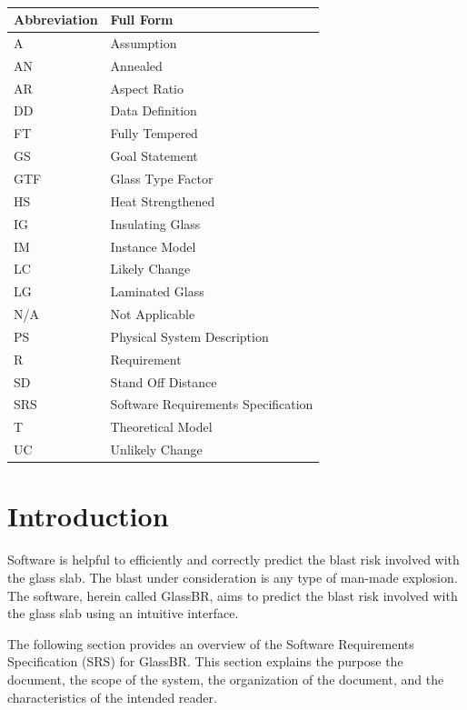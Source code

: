 \documentclass[12pt]{article}
\newcommand{\progname}{GlassBR}
\begin{document}
~\newline \renewcommand{\arraystretch}{1.2}
\noindent 
\begin{tabular}{l l } \toprule
  \textbf{Abbreviation} & \textbf{Full Form}\\
  \midrule
  A & Assumption\\
  AN & Annealed\\
  AR & Aspect Ratio\\
  DD & Data Definition\\
  FT & Fully Tempered\\
  GS & Goal Statement\\
  GTF & Glass Type Factor\\
  HS & Heat Strengthened \\
  IG & Insulating Glass \\
  IM & Instance Model\\
  LC & Likely Change\\
  LG & Laminated Glass\\
  N/A & Not Applicable\\
  PS & Physical System Description\\
  R & Requirement\\
  SD & Stand Off Distance\\
  SRS & 	Software Requirements Specification\\
  T & Theoretical Model\\
  UC & Unlikely Change\\
  \bottomrule
\end{tabular}

\section{Introduction}

Software is helpful to efficiently and correctly predict the blast risk involved
with the glass slab. The blast under consideration is any type of man-made
explosion. The software, herein called \progname, aims to predict the blast risk
involved with the glass slab using an intuitive interface.  

The following section provides an overview of the Software Requirements Specification (SRS)
for \progname.  This section explains the purpose the document, the scope of 
the system, the organization of the document, and the characteristics of 
the intended reader.
\end{document}
